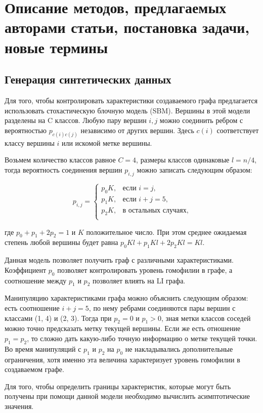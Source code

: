 \documentclass[a4paper,14pt]{article}
\begin{document}
	\pagebreak
	\section{Описание методов, предлагаемых авторами статьи, постановка задачи, новые термины}
	\setcounter{figure}{0}
	
	\subsection{Генерация синтетических данных}
	
	Для того, чтобы контролировать характеристики создаваемого графа предлагается использовать стохастическую блочную модель (SBM).
	Вершины в этой модели разделены на C классов.
	Любую пару вершин $i,j$ можно соединить ребром с вероятностью $p_{c(i)c(j)}$  независимо от других вершин.
	Здесь $c(i)$ соответствует классу вершины $i$ или искомой метке вершины.
	
	Возьмем  количество классов равное $C=4$, размеры классов одинаковые $l=n/4$, тогда вероятность соединения вершин $p_{i,j}$ можно записать следующим образом:
	
	$$p_{i,j} = \begin{cases}
		p_0K, & \text{если } i = j,\\
		p_1K, & \text{если } i + j = 5,\\
		p_2K, & \text{в остальных случаях},\\
	\end{cases}$$
	
	где $p_0+p_1+2p_2=1$ и $K$ положительное число.
	При этом среднее ожидаемая степень любой вершины будет равна $p_0 Kl+p_1 Kl+2p_2 Kl=Kl$.
	
	Данная модель позволяет получить граф с различными характеристиками.
	Коэффициент $p_0$ позволяет контролировать уровень гомофилии в графе, а соотношение между $p_1$ и $p_2$ позволяет влиять на LI графа.
	
	Манипуляцию характеристиками графа можно объяснить следующим образом: есть соотношение $i+j=5$, по нему ребрами соединяются пары вершин с классами (1, 4) и (2, 3).
	Тогда при $p_2=0$ и $p_1>0$, зная метки классов соседей можно точно предсказать метку текущей вершины.
	Если же есть отношение $p_1=p_2$, то сложно дать какую-либо точную информацию о метке текущей точки.
	Во время манипуляций с $p_1$ и $p_2$  на $p_0$ не накладывались дополнительные ограничения, хотя именно эта величина характеризует уровень гомофилии в создаваемом графе.
	
	Для того, чтобы определить границы характеристик, которые могут быть получены при помощи данной модели необходимо вычислить асимптотические значения.
	
\end{document}
